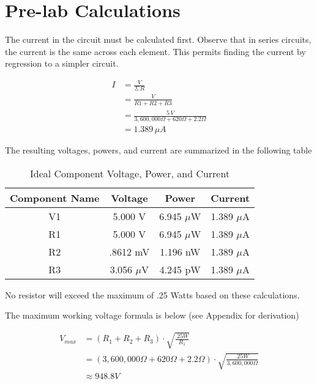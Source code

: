 \documentclass[journal]{IEEEtran}
\begin{document}
\section{Pre-lab Calculations}

The current in the circuit must be calculated first. Observe that in series circuits, the
current is the same across each element. This permits finding the current by regression to 
a simpler circuit. 

\begin{align*}
I&=\frac{V}{\Sigma\,R}\\
&=\frac{V}{R1+R2+R3}\\
&=\frac{5\,V}{3,600,000 \Omega + 620 \Omega + 2.2 \Omega}\\
&=1.389\,\mu A
\end{align*}

The resulting voltages, powers, and current are summarized in the following table

\begin{table}[h!]
\renewcommand{\arraystretch}{1.5}
\caption{Ideal Component Voltage, Power, and Current}
\label{table_ideal_vri}
\centering
\begin{tabular}{|c|c|c|c|}
\hline
Component Name & Voltage & Power & Current\\
\hline
V1 & 5.000 V & 6.945 $\mu$W & 1.389 $\mu$A\\
\hline
R1 & 5.000 V & 6.945 $\mu$W & 1.389 $\mu$A\\
\hline
R2 & .8612 mV & 1.196 nW & 1.389 $\mu$A\\
\hline
R3 & 3.056 $\mu$V & 4.245 pW & 1.389 $\mu$A\\
\hline
\end{tabular}
\end{table}

No resistor will exceed the maximum of .25 Watts based on these calculations.

The maximum working voltage formula is below (see Appendix for derivation)

\begin{align*}
V_{max}&=\left(R_{1}+R_{2}+R_{3}\right)\cdot\sqrt{\frac{.25W}{R_{1}}}\\
&=\left(3,600,000 \Omega + 620 \Omega + 2.2 \Omega\right)\cdot\sqrt{\frac{.25W}{3,600,000 \Omega}}\\
&\approx 948.8 V
\end{align*}
\end{document}
